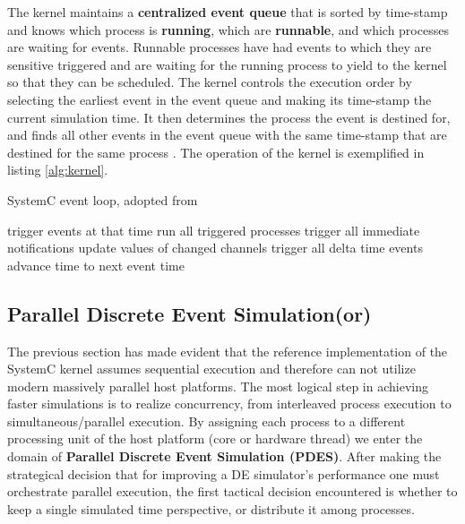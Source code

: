 \documentclass[12pt,twoside]{article}
\begin{document}
The kernel maintains a \textbf{centralized event queue} that is sorted by time-stamp and knows which process is \textbf{running}, which are \textbf{runnable}, and which processes are waiting for events.
Runnable processes have had events to which they are sensitive triggered and are waiting for the running process to yield to the kernel so that they can be scheduled.
The kernel controls the execution order by selecting the earliest event in the event queue and making its time-stamp the current simulation time.
It then determines the process the event is destined for, and finds all other events in the event queue with the same time-stamp that are destined for the same process \cite{Black2010}.
The operation of the kernel is exemplified in listing \ref{alg:kernel}.

\begin{algorithm}[H]
\caption{SystemC event loop, adopted from \cite{Schumacher2010}}
\label{alg:kernel}
\begin{algorithmic}[1]

     
      \State trigger events at that time
         
             \State run all triggered processes
             \State trigger all immediate notifications
         \EndWhile
         \State update values of changed channels
         \State trigger all delta time events
       \EndWhile
       \State advance time to next event time
   \EndWhile

\end{algorithmic}
\end{algorithm}



\subsection{Parallel Discrete Event Simulation(or)}
\label{sec-4-4}
The previous section has made evident that the reference implementation of the SystemC kernel assumes sequential execution and therefore can not utilize modern massively parallel host platforms. 
The most logical step in achieving faster simulations is to realize concurrency, from interleaved process execution to simultaneous/parallel execution.
By assigning each process to a different processing unit of the host platform (core or hardware thread) we enter the domain of \textbf{Parallel Discrete Event Simulation (PDES)}.
After making the strategical decision that for improving a DE simulator's performance one must orchestrate parallel execution, 
the first tactical decision encountered
is whether to keep a single simulated time perspective, 
or distribute it among processes.
\end{document}
